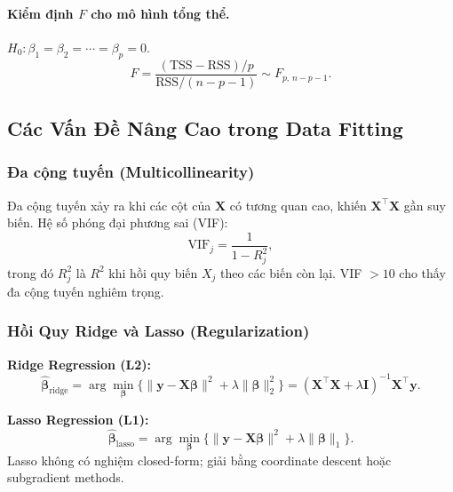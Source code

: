 \paragraph{Kiểm định $F$ cho mô hình tổng thể.}
$H_0: \beta_1 = \beta_2 = \cdots = \beta_p = 0$.
\begin{equation}
    F = \frac{(\mathrm{TSS} - \mathrm{RSS})/p}{\mathrm{RSS}/(n-p-1)} \sim F_{p,\,n-p-1}.
\end{equation}

\subsection{Các Vấn Đề Nâng Cao trong Data Fitting}

\subsubsection{Đa cộng tuyến (Multicollinearity)}

Đa cộng tuyến xảy ra khi các cột của $\mathbf{X}$ có tương quan cao, khiến
$\mathbf{X}^\top\mathbf{X}$ gần suy biến. Hệ số phóng đại phương sai (VIF):
\begin{equation}
    \mathrm{VIF}_j = \frac{1}{1 - R_j^2},
\end{equation}
trong đó $R_j^2$ là $R^2$ khi hồi quy biến $X_j$ theo các biến còn lại.
VIF $> 10$ cho thấy đa cộng tuyến nghiêm trọng.

\subsubsection{Hồi Quy Ridge và Lasso (Regularization)}

\textbf{Ridge Regression (L2):}
\begin{equation}
    \hat{\boldsymbol{\beta}}_{\mathrm{ridge}}
    = \arg\min_{\boldsymbol{\beta}}
      \bigl\{\|\mathbf{y} - \mathbf{X}\boldsymbol{\beta}\|^2 + \lambda\|\boldsymbol{\beta}\|_2^2\bigr\}
    = (\mathbf{X}^\top\mathbf{X} + \lambda\mathbf{I})^{-1}\mathbf{X}^\top\mathbf{y}.
\end{equation}

\textbf{Lasso Regression (L1):}
\begin{equation}
    \hat{\boldsymbol{\beta}}_{\mathrm{lasso}}
    = \arg\min_{\boldsymbol{\beta}}
      \bigl\{\|\mathbf{y} - \mathbf{X}\boldsymbol{\beta}\|^2 + \lambda\|\boldsymbol{\beta}\|_1\bigr\}.
\end{equation}
Lasso không có nghiệm closed-form; giải bằng coordinate descent hoặc subgradient methods.

